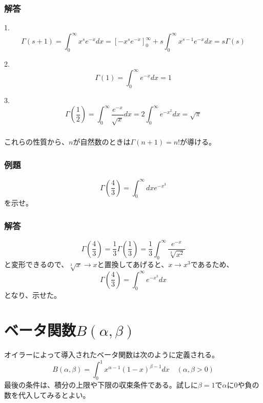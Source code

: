 \documentclass[a4j,dvipdfmx]{jsarticle}
\begin{document}
\subsubsection*{解答}
1.
\begin{equation*}
\Gamma(s+1)=\int_0^\infty x^s e^{-x}dx =\left[-x^s e^{-x}\right]_0^\infty+s\int_0^\infty x^{s-1}e^{-x}dx=s\Gamma(s)  
\end{equation*}

2.
\begin{equation*}
    \Gamma(1)=\int_0^\infty e^{-x}dx=1
\end{equation*}

3.
\begin{equation*}
    \Gamma\left(\frac{1}{2}\right)=\int_0^\infty \frac{e^{-x}}{\sqrt{x}}dx=2\int_0^\infty e^{-x^2}dx=\sqrt{\pi}
\end{equation*}
\subsubsection*{}
これらの性質から、$n$が自然数のときは$\Gamma(n+1)=n!$が導ける。
\subsubsection*{例題}
\begin{equation*}
    \Gamma\left(\frac{4}{3}\right)=\int_0^\infty dx e^{-x^3}
\end{equation*}
を示せ。
\subsubsection*{解答}
\begin{equation*}
    \Gamma\left(\frac{4}{3}\right)=\frac{1}{3}\Gamma\left(\frac{1}{3}\right)=\frac{1}{3}\int_0^\infty \frac{e^{-x}}{\sqrt[3]{x^2}}
\end{equation*}
と変形できるので、$\sqrt[3]{x}\to x$と置換してあげると、$x\to x^3$であるため、
\begin{equation*}
    \Gamma\left(\frac{4}{3}\right)=\int_0^\infty e^{-x^3}dx
\end{equation*}
となり、示せた。
\section{ベータ関数$B(\alpha,\beta)$}
オイラーによって導入されたベータ関数は次のように定義される。
\begin{equation*}
    B(\alpha,\beta)=\int_0^1 x^{\alpha-1}(1-x)^{\beta-1}dx\quad(\alpha,\beta>0)
\end{equation*}
最後の条件は、積分の上限や下限の収束条件である。試しに$\beta=1$で$\alpha$に$0$や負の数を代入してみるとよい。
\end{document}
